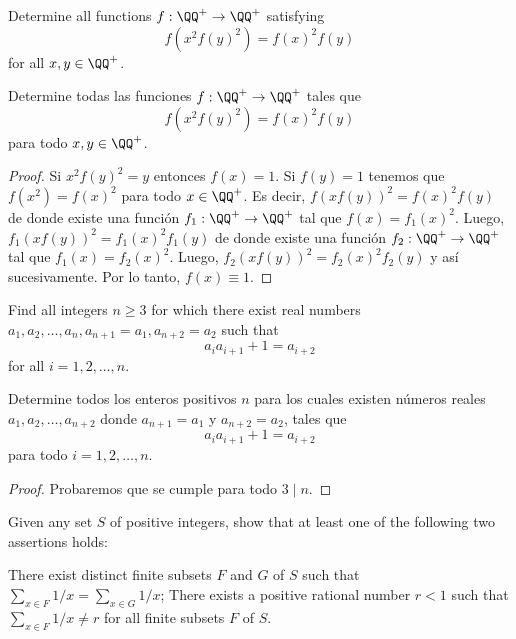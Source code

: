 \begin{probEG}
	Determine all functions $f:\QQ^+\to\QQ^+$ satisfying
	\[f(x^2f(y)^2)=f(x)^2f(y)\]
	for all $x,y\in\QQ^+$.
	\begin{probSM}
		Determine todas las funciones $f:\QQ^+\to\QQ^+$ tales que
		\[f(x^2f(y)^2)=f(x)^2f(y)\]
		para todo $x,y\in\QQ^+$.
	\end{probSM}
\end{probEG}

\begin{proof}
	Si $x^2f(y)^2=y$ entonces $f(x)=1$. Si $f(y)=1$ tenemos que $f(x^2)=f(x)^2$ para todo $x\in\QQ^+$. Es decir, $f(xf(y))^2=f(x)^2f(y)$ de donde existe una función $f_1:\QQ^+\to\QQ^+$ tal que $f(x)=f_1(x)^2$. Luego, $f_1(xf(y))^2=f_1(x)^2f_1(y)$ de donde existe una función $f_2:\QQ^+\to\QQ^+$ tal que $f_1(x)=f_2(x)^2$. Luego, $f_2(xf(y))^2=f_2(x)^2f_2(y)$ y así sucesivamente. Por lo tanto, $f(x)\equiv 1$.
\end{proof}

\begin{probMR}
	Find all integers $n\ge 3$ for which there exist real numbers $a_1,a_2,\dots,a_n,a_{n+1}=a_1,a_{n+2}=a_2$ such that
	\[a_ia_{i+1}+1=a_{i+2}\]
	for all $i=1,2,\dots,n$.
	\begin{probSM}
		Determine todos los enteros positivos $n$ para los cuales existen números reales $a_1,a_2,\dots,a_{n+2}$ donde $a_{n+1}=a_1$ y $a_{n+2}=a_2$, tales que
		\[a_ia_{i+1}+1=a_{i+2}\]
		para todo $i=1,2,\dots,n$.
	\end{probSM}
\end{probMR}

\begin{proof}
	Probaremos que se cumple para todo $3\mid n$.
\end{proof}

\begin{probMB}
	Given any set $S$ of positive integers, show that at least one of the following two assertions holds:
	\begin{enumerate}[(1)]
		\ii \label{enumi:finite_subsets} There exist distinct finite subsets $F$ and $G$ of $S$ such that $\sum_{x\in F}1/x=\sum_{x\in G}1/x$;
		\ii \label{enumi:rational_number} There exists a positive rational number $r<1$ such that $\sum_{x\in F}1/x\ne r$ for all finite subsets $F$ of $S$.
	\end{enumerate}
\end{probMB}

